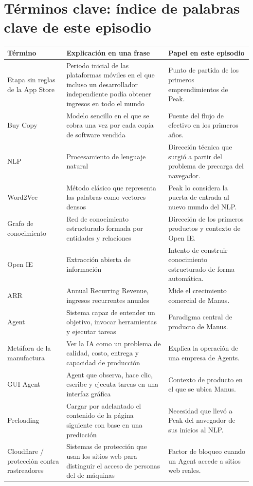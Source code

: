 \section{Términos clave: índice de palabras clave de este episodio}

\begin{longtable}{p{}p{}p{}}
\toprule
Término & Explicación en una frase & Papel en este episodio \\
\midrule
Etapa sin reglas de la App Store & Periodo inicial de las plataformas móviles en el que incluso un desarrollador independiente podía obtener ingresos en todo el mundo & Punto de partida de los primeros emprendimientos de Peak. \\
Buy Copy & Modelo sencillo en el que se cobra una vez por cada copia de software vendida & Fuente del flujo de efectivo en los primeros años. \\
NLP & Procesamiento de lenguaje natural & Dirección técnica que surgió a partir del problema de precarga del navegador. \\
Word2Vec & Método clásico que representa las palabras como vectores densos & Peak lo considera la puerta de entrada al nuevo mundo del NLP. \\
Grafo de conocimiento & Red de conocimiento estructurado formada por entidades y relaciones & Dirección de los primeros productos y contexto de Open IE. \\
Open IE & Extracción abierta de información & Intento de construir conocimiento estructurado de forma automática. \\
ARR & Annual Recurring Revenue, ingresos recurrentes anuales & Mide el crecimiento comercial de Manus. \\
Agent & Sistema capaz de entender un objetivo, invocar herramientas y ejecutar tareas & Paradigma central de producto de Manus. \\
Metáfora de la manufactura & Ver la IA como un problema de calidad, costo, entrega y capacidad de producción & Explica la operación de una empresa de Agents. \\
GUI Agent & Agent que observa, hace clic, escribe y ejecuta tareas en una interfaz gráfica & Contexto de producto en el que se ubica Manus. \\
Preloading & Cargar por adelantado el contenido de la página siguiente con base en una predicción & Necesidad que llevó a Peak del navegador de sus inicios al NLP. \\
Cloudflare / protección contra rastreadores & Sistemas de protección que usan los sitios web para distinguir el acceso de personas del de máquinas & Factor de bloqueo cuando un Agent accede a sitios web reales. \\

\end{longtable}
